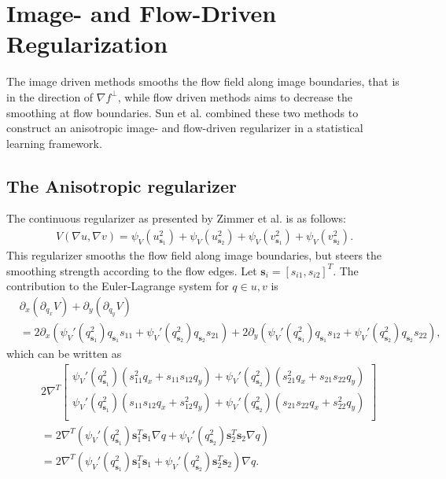 \chapter{Image- and Flow-Driven Regularization}

The image driven methods smooths the flow field along image boundaries, that is in the direction of $\nabla f ^{\perp}$, while flow driven methods aims to decrease the smoothing at flow boundaries. Sun et al. \cite{Sun2008} combined these two methods to construct an anisotropic image- and flow-driven regularizer in a statistical learning framework.
\section{The Anisotropic regularizer}
The continuous regularizer as presented by Zimmer et al. \cite{zimmer2011optic} is as follows:
\begin{align}
\label{IFRegularizer}
V(\nabla u, \nabla v) = \psi_V(u_{\textbf{s}_1}^2) + \psi_V(u_{\textbf{s}_2}^2) + \psi_V(v_{\textbf{s}_1}^2) +\psi_V(v_{\textbf{s}_2}^2).
\end{align}
This regularizer smooths the flow field along image boundaries, but steers the smoothing strength according to the flow edges. Let $\textbf{s}_i = [s_{i1}, s_{i2}]^T$. The contribution to the Euler-Lagrange system for $q \in u,v$ is
\begin{align*}
&\partial_x (\partial_{q_x} V) + \partial_y (\partial_{q_y} V) \\
&= 2\partial_x \left( \psi_V'(q_{\textbf{s}_1}^2)q_{\textbf{s}_1}s_{11} +\psi_V'(q_{\textbf{s}_2}^2)q_{\textbf{s}_2}s_{21} \right) + 2\partial_y \left( \psi_V'(q_{\textbf{s}_1}^2)q_{\textbf{s}_1}s_{12} + \psi_V'(q_{\textbf{s}_2}^2)q_{\textbf{s}_2}s_{22} \right),
\end{align*}
which can be written as
\begin{align*}
&2 \nabla^T \begin{bmatrix}
         \psi_V'(q_{\textbf{s}_1}^2)\left(s_{11}^2 q_x + s_{11}s_{12}q_y\right) +\psi_V'(q_{\textbf{s}_2}^2) \left( s_{21}^2 q_x + s_{21}s_{22}q_y \right) \\
         \psi_V'(q_{\textbf{s}_1}^2)\left(s_{11}s_{12}q_x + s_{12}^2 q_y \right) + \psi_V'(q_{\textbf{s}_2}^2) \left( s_{21}s_{22}q_x + s_{22}^2q_y \right) \\
        \end{bmatrix} \\
& = 2 \nabla^T \left( \psi_V'(q_{\textbf{s}_1}^2) \textbf{s}_1^T \textbf{s}_1 \nabla q + \psi_V'(q_{\textbf{s}_2}^2) \textbf{s}_2^T \textbf{s}_2 \nabla q \right) \\
& = 2 \nabla^T \left( \psi_V'(q_{\textbf{s}_1}^2) \textbf{s}_1^T \textbf{s}_1 + \psi_V'(q_{\textbf{s}_2}^2) \textbf{s}_2^T \textbf{s}_2 \right) \nabla q.
\end{align*}

